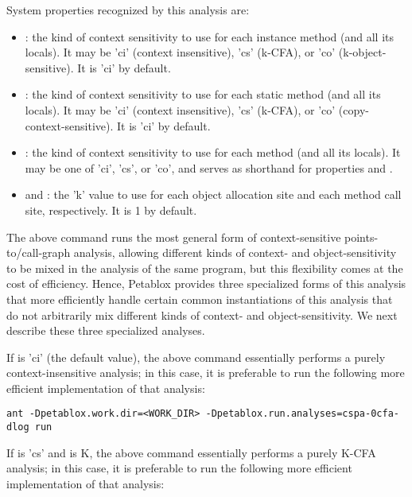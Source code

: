 System properties recognized by this analysis are:
\begin{itemize}
\item
{}: the kind of context sensitivity to use for each
instance method (and all its locals).  It may be 'ci' (context insensitive), 'cs'
(k-CFA), or 'co' (k-object-sensitive).  It is 'ci' by default.
\item
{}: the kind of context sensitivity to use for each
static method (and all its locals).  It may be 'ci' (context insensitive), 'cs'
(k-CFA), or 'co' (copy-context-sensitive).  It is 'ci' by default.
\item
{}: the kind of context sensitivity to use for each method
(and all its locals).  It may be one of 'ci', 'cs', or 'co', and serves as
shorthand for properties  and .
\item
{} and : the 'k' value to use for each object
allocation site and each method call site, respectively.
It is 1 by default.
\end{itemize}

The above command runs the most general form of context-sensitive
points-to/call-graph analysis,
allowing different kinds of context- and object-sensitivity to be mixed in the analysis of
the same program, but this flexibility comes at the cost of efficiency.
Hence, Petablox provides three specialized forms of this analysis that more
efficiently handle certain common instantiations of this analysis that do not
arbitrarily mix different kinds of context- and object-sensitivity.  We next describe these
three specialized analyses.

If  is 'ci' (the default value),
the above command essentially performs a purely context-insensitive
analysis; in this case, it is preferable to run the following more efficient
implementation of that analysis:

\begin{framed}
\begin{verbatim}
ant -Dpetablox.work.dir=<WORK_DIR> -Dpetablox.run.analyses=cspa-0cfa-dlog run
\end{verbatim}
\end{framed}

If  is 'cs' and  is K,
the above command essentially performs a purely K-CFA analysis; in this case, it
is preferable to run the following more efficient implementation of that
analysis:

